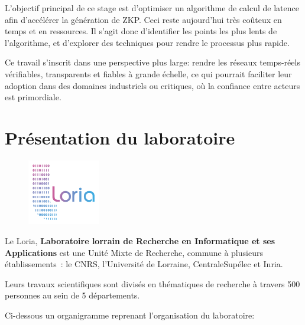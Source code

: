 \documentclass[12pt]{report}
\begin{document}
\bigskip

L'objectif principal de ce stage est d'optimiser un algorithme de calcul de latence 
afin d'accélérer la génération de ZKP. Ceci reste aujourd'hui 
très coûteux en temps et en ressources. Il s'agit donc d'identifier les 
points les plus lents de l'algorithme, et d'explorer des techniques pour rendre le
processus plus rapide.

\bigskip

Ce travail s'inscrit dans une perspective plus large: rendre les 
réseaux temps-réels vérifiables, transparents et fiables à grande échelle, 
ce qui pourrait faciliter leur adoption dans des domaines industriels ou 
critiques, où la confiance entre acteurs est primordiale.

\section*{Présentation du laboratoire}

\begin{figure}
    \vspace{-10pt}
    \includegraphics[width=0.28\textwidth]{logo_loria.png}
    \vspace{-10pt}
\end{figure}

Le Loria, \textbf{Laboratoire lorrain de Recherche en Informatique et 
ses Applications} est une Unité Mixte de Recherche, commune à plusieurs 
établissements : le CNRS, l'Université de Lorraine, CentraleSupélec et 
Inria.

Leurs travaux scientifiques sont divisés en thématiques de recherche à travers 
500 personnes au sein de 5 départements.

\medskip

Ci-dessous un organigramme reprenant l'organisation du laboratoire:

\vspace{1cm}  
\end{document}
